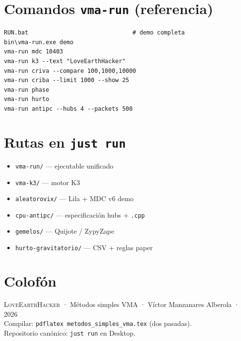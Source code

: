 \documentclass[11pt,a4paper,twoside]{book}
\newcommand{\LoveEarthHacker}{\textsc{LoveEarthHacker}}
\begin{document}
\appendix
\chapter{Comandos \texttt{vma-run} (referencia)}

\begin{lstlisting}
RUN.bat                              # demo completa
bin\vma-run.exe demo
vma-run mdc 10403
vma-run k3 --text "LoveEarthHacker"
vma-run criva --compare 100,1000,10000
vma-run criba --limit 1000 --show 25
vma-run phase
vma-run hurto
vma-run antipc --hubs 4 --packets 500
\end{lstlisting}

\chapter{Rutas en \texttt{just run}}
\begin{itemize}
  \item \texttt{vma-run/} --- ejecutable unificado
  \item \texttt{vma-k3/} --- motor K3
  \item \texttt{aleatorovix/} --- Lila + MDC v6 demo
  \item \texttt{cpu-antipc/} --- especificación hubs + \texttt{.cpp}
  \item \texttt{gemelos/} --- Quijote / ZypyZape
  \item \texttt{hurto-gravitatorio/} --- CSV + reglas paper
\end{itemize}

\backmatter
\chapter*{Colofón}
\LoveEarthHacker{} · Métodos simples VMA · Víctor Manzanares Alberola · 2026\\
Compilar: \texttt{pdflatex metodos\_simples\_vma.tex} (dos pasadas).\\
Repositorio canónico: \texttt{just run} en Desktop.
\end{document}
